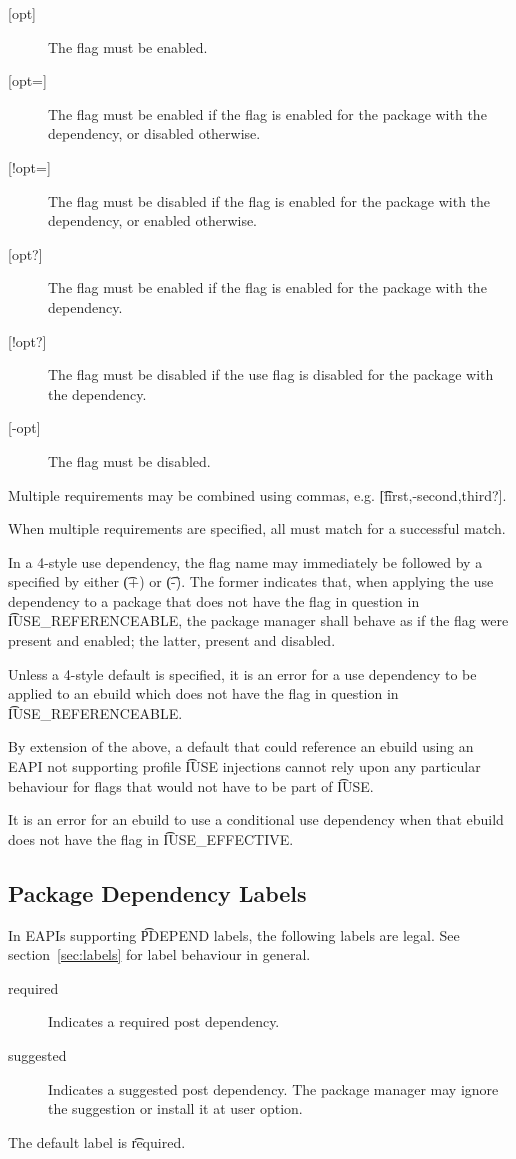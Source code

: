 \begin{description}
\item[{[opt]}] The flag must be enabled.
\item[{[opt=]}] The flag must be enabled if the flag is enabled for the package with the
    dependency, or disabled otherwise.
\item[{[!opt=]}] The flag must be disabled if the flag is enabled for the package with the
    dependency, or enabled otherwise.
\item[{[opt?]}] The flag must be enabled if the flag is enabled for the package with the
    dependency.
\item[{[!opt?]}] The flag must be disabled if the use flag is disabled for the package with the
    dependency.
\item[{[-opt]}] The flag must be disabled.
\end{description}

Multiple requirements may be combined using commas, e.g. \t{[first,-second,third?]}.

When multiple requirements are specified, all must match for a successful match.

 In a 4-style use dependency, the flag name may immediately be
followed by a  specified by either \t{(+)} or \t{(-)}. The former indicates that, when
applying the use dependency to a package that does not have the flag in question in
\t{IUSE\_REFERENCEABLE}, the package manager shall behave as if the flag were present and enabled;
the latter, present and disabled.

Unless a 4-style default is specified, it is an error for a use dependency to be applied to an
ebuild which does not have the flag in question in \t{IUSE\_REFERENCEABLE}.

\note By extension of the above, a default that could reference an ebuild using an EAPI not
supporting profile \t{IUSE} injections cannot rely upon any particular behaviour for flags that
would not have to be part of \t{IUSE}.

It is an error for an ebuild to use a conditional use dependency when that ebuild does not have the
flag in \t{IUSE\_EFFECTIVE}.

\IFKDEBUILDELSE
{
    \subsection{Package Dependency Labels}

    In EAPIs supporting \t{PDEPEND} labels, the following labels are legal. See
    section~\ref{sec:labels} for label behaviour in general.

    \begin{description}
    \item[required] Indicates a required post dependency.
    \item[suggested] Indicates a suggested post dependency. The package manager may ignore the
        suggestion or install it at user option.
    \end{description}

    The default label is \t{required}.
}{
}

